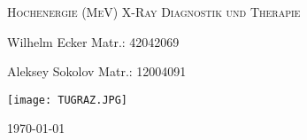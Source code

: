 \label{sec:Titelblatt}

\begin{titlepage}
    \centering
    \vspace{6cm}
    {\scshape\Large Hochenergie (MeV) X-Ray Diagnostik und Therapie \par}
    \vspace{3cm}
    {\Large Wilhelm Ecker Matr.: 42042069 \par } 
    {\Large Aleksey Sokolov Matr.: 12004091 \par}
    \vspace{2cm}
    {\texttt{[image: TUGRAZ.JPG]}\par}
    
    \vfill
    {\large \today\par} 
\end{titlepage}